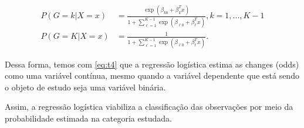 \begin{equation}
  \label{eq:t4}
  \begin{aligned}
    P(G = k | X = x) &= \frac{\exp \left ( \beta_{k0}+\beta_{k}^{T}x \right )}{1 + \sum_{\ell=1}^{K - 1}\exp \left ( \beta_{\ell0}+\beta_{\ell}^{T}x \right )}, k = 1, ..., K - 1\\
    P(G = K | X = x) &= \frac{1}{1 + \sum_{\ell=1}^{K - 1}\exp \left ( \beta_{\ell0}+\beta_{\ell}^{T}x \right )} .
  \end{aligned}
\end{equation}

Dessa forma, temos com \ref{eq:t4} que a regressão logística estima as changes (odds) como uma variável contínua, mesmo quando a variável dependente que está sendo o objeto de estudo seja uma variável binária. 

Assim, a regressão logística viabiliza a classificação das observações por meio da probabilidade estimada na categoria estudada.
